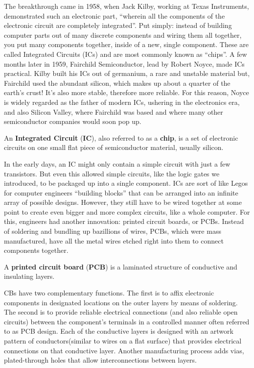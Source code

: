 The breakthrough came in 1958, when Jack Kilby, working at Texas Instruments, demonstrated such an electronic part,
``wherein all the components of the electronic circuit are completely integrated''. Put simply: instead of building
computer parts out of many discrete components and wiring them all together, you put many components together, inside
of a new, single component. These are called Integrated Circuits (ICs) and are most commonly known as ``chips''. A
few months later in 1959, Fairchild Semiconductor, lead by Robert Noyce, made ICs practical. Kilby built his ICs out
of germanium, a rare and unstable material but, Fairchild used the abundant silicon, which makes up about a quarter
of the earth's crust! It's also more stable, therefore more reliable. For this reason, Noyce is widely regarded as
the father of modern ICs, ushering in the electronics era, and also Silicon Valley, where Fairchild was based and
where many other semiconductor companies would soon pop up.

An \textbf{Integrated Circuit} (\textbf{IC}), also referred to as a \textbf{chip}, is a set of electronic circuits on
one small flat piece of semiconductor material, usually silicon.
\ed


In the early days, an IC might only contain a simple circuit with just a few transistors. But even this allowed
simple circuits, like the logic gates we introduced, to be packaged up into a single component. ICs are sort of like
Legos for computer engineers ``building blocks'' that can be arranged into an infinite array of possible designs.
However, they still have to be wired together at some point to create even bigger and more complex circuits, like a
whole computer. For this, engineers had another innovation: printed circuit boards, or PCBs. Instead of soldering and
bundling up bazillions of wires, PCBs, which were mass manufactured, have all the metal wires etched right into
them to connect components together.

A \textbf{printed circuit board} (\textbf{PCB}) is a laminated structure of conductive and insulating layers.
\ed

CBs have two complementary functions. The first is to affix electronic components in designated locations on the
outer layers by means of soldering. The second is to provide reliable electrical connections (and also reliable open
circuits) between the component's terminals in a controlled manner often referred to as PCB design. Each of the
conductive layers is designed with an artwork pattern of conductors(similar to wires on a flat surface) that provides
electrical connections on that conductive layer. Another manufacturing process adds vias, plated-through holes that
allow interconnections between layers.

